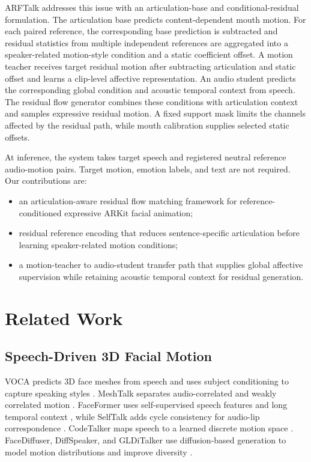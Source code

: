 \documentclass[conference]{IEEEtran}
\begin{document}
ARFTalk addresses this issue with an articulation-base and conditional-residual formulation. The articulation base predicts content-dependent mouth motion. For each paired reference, the corresponding base prediction is subtracted and residual statistics from multiple independent references are aggregated into a speaker-related motion-style condition and a static coefficient offset. A motion teacher receives target residual motion after subtracting articulation and static offset and learns a clip-level affective representation. An audio student predicts the corresponding global condition and acoustic temporal context from speech. The residual flow generator combines these conditions with articulation context and samples expressive residual motion. A fixed support mask limits the channels affected by the residual path, while mouth calibration supplies selected static offsets.

At inference, the system takes target speech and registered neutral reference audio-motion pairs. Target motion, emotion labels, and text are not required. Our contributions are:
\begin{itemize}
\item an articulation-aware residual flow matching framework for reference-conditioned expressive ARKit facial animation;
\item residual reference encoding that reduces sentence-specific articulation before learning speaker-related motion conditions;
\item a motion-teacher to audio-student transfer path that supplies global affective supervision while retaining acoustic temporal context for residual generation.
\end{itemize}
\section{Related Work}
\subsection{Speech-Driven 3D Facial Motion}
VOCA predicts 3D face meshes from speech and uses subject conditioning to capture speaking styles \cite{voca}. MeshTalk separates audio-correlated and weakly correlated motion \cite{meshtalk}. FaceFormer uses self-supervised speech features and long temporal context \cite{faceformer}, while SelfTalk adds cycle consistency for audio-lip correspondence \cite{selftalk}. CodeTalker maps speech to a learned discrete motion space \cite{codetalker}. FaceDiffuser, DiffSpeaker, and GLDiTalker use diffusion-based generation to model motion distributions and improve diversity \cite{facediffuser,diffspeaker,glditalker}.
\end{document}
